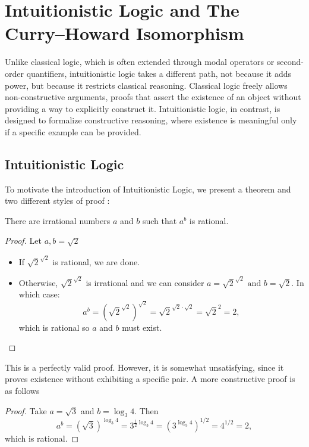 
\chapter{Intuitionistic Logic and The Curry--Howard Isomorphism}

Unlike classical logic, which is often extended through modal operators or second-order quantifiers, intuitionistic logic takes a different path, not because it adds power, but because it restricts classical reasoning. Classical logic freely allows non-constructive arguments, proofs that assert the existence of an object without providing a way to explicitly construct it. Intuitionistic logic, in contrast, is designed to formalize constructive reasoning, where existence is meaningful only if a specific example can be provided.

\section{\centering Intuitionistic Logic}
To motivate the introduction of Intuitionistic Logic, we present a theorem and two different styles of proof \cite{openlogicprojectintuitionisticlogic2025}:
\begin{theorem}
There are irrational numbers $a$ and $b$ such that $a^b$ is rational.
\end{theorem}
\begin{proof}
  Let $ a, b = \sqrt{2} $
  \begin{itemize}
  \item If $\sqrt{2}^{\sqrt{2}}$ is rational, we are done.
  \item Otherwise, $\sqrt{2}^{\sqrt{2}}$ is irrational and we can consider \( a = \sqrt{2}^{\sqrt{2}} \text{ and } b = \sqrt{2} \). In which case:
    \[
      a^b = \left( \sqrt{2}^{\sqrt{2}} \right)^{\sqrt{2}} = \sqrt{2}^{\sqrt{2}\cdot \sqrt{2}}
      = \sqrt{2}^2 = 2,
    \]
    which is rational so $a$ and $b$ must exist.
  \end{itemize}
  \end{proof}

  \medskip
  This is a perfectly valid proof. However, it is somewhat unsatisfying, since it proves existence without exhibiting a specific pair. A more constructive proof is as follows
\begin{proof}
  \medskip
  Take $a = \sqrt{3}$ and $b = \log_3 4$. Then
  \[
    a^b = \left(\sqrt{3}\right)^{\log_3 4}
    = 3^{\tfrac{1}{2}\log_3 4}
    = \left(3^{\log_3 4}\right)^{1/2}
    = 4^{1/2} = 2,
  \]
  which is rational.
\end{proof}

